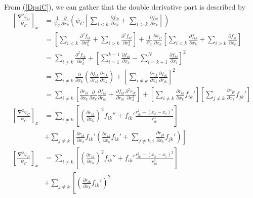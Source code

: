\documentclass[twocolumn,8pt]{extarticle}
\newcommand{\eq}[1]{{\tiny\begin{align*}#1\end{align*}}}
\begin{document}
From (\ref{DpsiC}), we can gather that the double derivative part is described by
\eq{
  \left[\frac{\mathbf{\nabla}^2 \psi_C}{\psi_C}\right]_x
  &=\frac{1}{\psi_C}\frac{\partial}{\partial x_k}\left(\psi_C
      \left[\sum_{i<k} \frac{\partial f_{ik}}{\partial x_k}
      +\sum_{i>k} \frac{\partial f_{ki}}{\partial x_k} \right]\right)\\
  &=\left[\sum_{i<k} \frac{\partial^2 f_{ik}}{\partial x_k^2}
      +\sum_{i>k} \frac{\partial^2 f_{ki}}{\partial x_k^2} \right]
      +\frac{1}{\psi_C}\frac{\partial \psi_C}{\partial x_k}
      \left[\sum_{i<k} \frac{\partial f_{ik}}{\partial x_k}
      +\sum_{i>k} \frac{\partial f_{ki}}{\partial x_k} \right]\\
  &=\sum_{i\neq k}\frac{\partial^2 f_{ik}}{\partial x_k^2} +
    \left[\sum_{i=1}^{k-1}\frac{\partial f_{ik}}{\partial x_k} -
    \sum_{i=k+1}^{N}\frac{\partial f_{ki}}{\partial x_i}
    \right]^2\\
  &=\sum_{i\neq k}
    \frac{\partial}{\partial x_k}
    \left(
    \frac{\partial f_{ik}}{\partial r_{ik}}
    \frac{\partial r_{ik}}{\partial x_k}
    \right)+
    \left[\sum_{i\neq k}\frac{\partial r_{ik}}{\partial x_k}
    \frac{\partial f_{ik}}{\partial r_{ik}}
    \right]^2\\
  &=\sum_{i\neq k}
    \left[
    \frac{\partial r_{ik}}{\partial x_k}
    \frac{\partial}{\partial x_k}
    \frac{\partial f_{ik}}{\partial r_{ik}}
    +
    \frac{\partial f_{ik}}{\partial r_{ik}}
    \frac{\partial^2 r_{ik}}{\partial x_k^2}\right]
    +
    \left[\sum_{i\neq k}\frac{\partial r_{ik}}{\partial x_k} f_{ik}'
    \right]
    \left[\sum_{j\neq k}\frac{\partial r_{jk}}{\partial x_k} f_{jk}'
    \right]\\
  \left[\frac{\mathbf{\nabla}^2 \psi_C}{\psi_C}\right]_x
  &=\sum_{i\neq k}
    \left[
    \left(
    \frac{\partial r_{ik}}{\partial x_k}
    \right)^2
    f_{ik}''
    +
    f_{ik}'
    \frac{r_{ik}^2 - (x_k-x_i)^2}{r_{ik}^3}\right]
    \\&+
    \sum_{j\neq k}\left[\frac{\partial r_{ik}}{\partial x_k} f_{ik}'\left(
    \frac{\partial r_{ik}}{\partial x_k} f_{ik}'+
    \sum_{j\neq k,i} \frac{\partial r_{jk}}{\partial x_k} f_{jk}'\right)
    \right]\\
  \left[\frac{\mathbf{\nabla}^2 \psi_C}{\psi_C}\right]_x
  &=\sum_{i\neq k}
    \left[
    \left(
    \frac{\partial r_{ik}}{\partial x_k}
    \right)^2
    f_{ik}''
    +
    f_{ik}'
    \frac{r_{ik}^2 - (x_k-x_i)^2}{r_{ik}^3}\right]
    \\&+
    \sum_{j\neq k}\left[\left(\frac{\partial r_{ik}}{\partial x_k} f_{ik}'\right)^2
}
\end{document}
